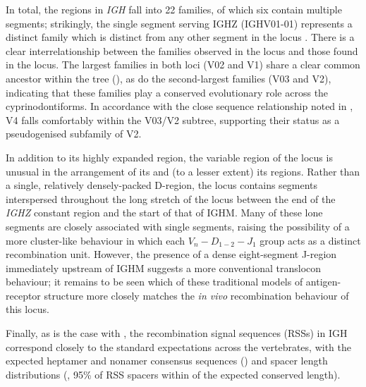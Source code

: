 	In total, the \vh regions in \Xma \textit{IGH} fall into 22 families, of which six contain multiple segments; strikingly, the single \vh segment serving IGHZ (IGHV01-01) represents a distinct family which is distinct from any other segment in the locus . 	There is a clear interrelationship between the \vh families observed in the \Xma locus and those found in the \Nfu locus. The largest families in both loci (\Xma V02 and \Nfu V1) share a clear common ancestor within the \vh tree (), as do the second-largest families (\Xma V03 and \Nfu V2), indicating that these families play a conserved evolutionary role across the cyprinodontiforms. In accordance with the close sequence relationship noted in , \Nfu V4 falls comfortably within the V03/V2 subtree, supporting their status as a pseudogenised subfamily of \Nfu V2. 
		
	In addition to its highly expanded \vh region, the variable region of the \Xma locus is unusual in the arrangement of its \dh and (to a lesser extent) its \jh regions. Rather than a single, relatively densely-packed D-region, the \Xma locus contains \dh segments interspersed throughout the long stretch of the locus between the end of the \textit{IGHZ} constant region and the start of that of IGHM. Many of these lone \dh segments are closely associated with single \jh segments, raising the possibility of a more cluster-like behaviour in which each $V_n-D_{1-2}-J_1$ group acts as a distinct recombination unit. However, the presence of a dense eight-segment J-region immediately upstream of IGHM suggests a more conventional translocon behaviour; it remains to be seen which of these traditional models of antigen-receptor structure more closely matches the \textit{in vivo} recombination behaviour of this locus.
	
	
	Finally, as is the case with \Nfu, the recombination signal sequences (RSSs) in \Xma IGH correspond closely to the standard expectations across the vertebrates, with the expected heptamer and nonamer consensus sequences () and spacer length distributions (, 95\% of RSS spacers within  of the expected conserved length).
	

	
